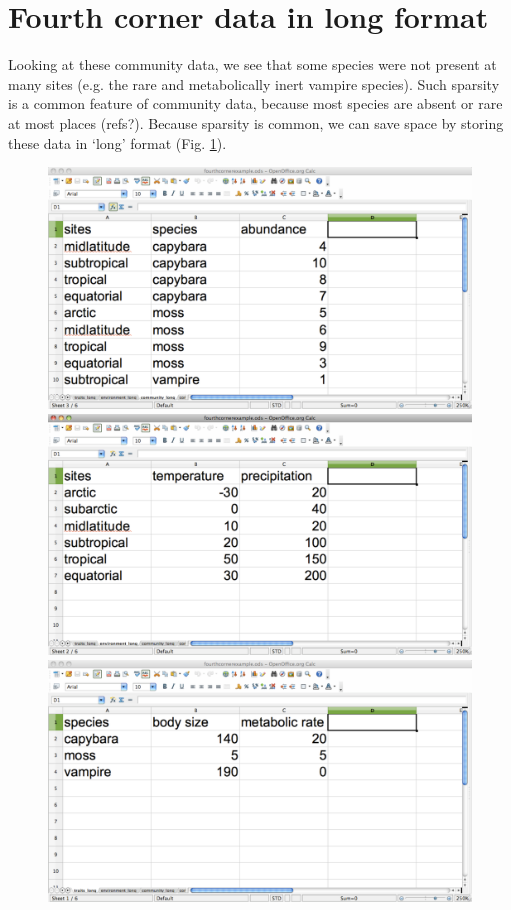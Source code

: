\documentclass{article}
\numberwithin{exercise}{section}
\begin{document}
\section{Fourth corner data in long format}

Looking at these community data, we see that some species were not present at many sites (e.g. the rare and metabolically inert vampire species).  Such sparsity is a common feature of community data, because most species are absent or rare at most places (refs?).  Because sparsity is common, we can save space by storing these data in `long' format (Fig. \ref{fig:longspreadsheetfc}). \begin{figure}
\label{fig:longspreadsheetfc}
\includegraphics{./readingmultipletables/community_long.pdf}
\includegraphics{./readingmultipletables/environment_long.pdf}
\includegraphics{./readingmultipletables/traits_long.pdf}

\end{figure}
\end{document}

